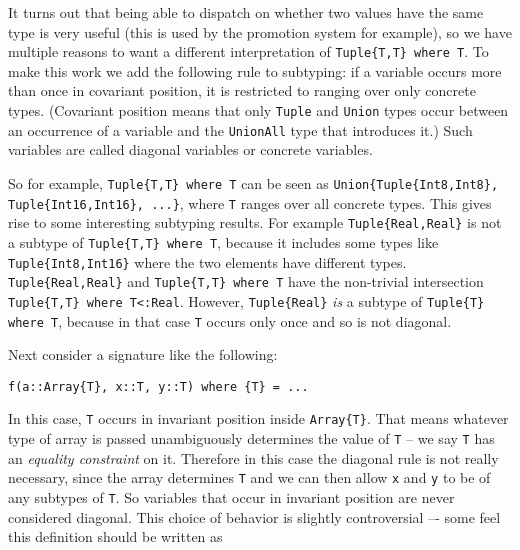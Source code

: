 It turns out that being able to dispatch on whether two values have the same type is very useful (this is used by the promotion system for example), so we have multiple reasons to want a different interpretation of \texttt{Tuple\{T,T\} where T}. To make this work we add the following rule to subtyping: if a variable occurs more than once in covariant position, it is restricted to ranging over only concrete types. ({\textquotedbl}Covariant position{\textquotedbl} means that only \texttt{Tuple} and \texttt{Union} types occur between an occurrence of a variable and the \texttt{UnionAll} type that introduces it.) Such variables are called {\textquotedbl}diagonal variables{\textquotedbl} or {\textquotedbl}concrete variables{\textquotedbl}.



So for example, \texttt{Tuple\{T,T\} where T} can be seen as \texttt{Union\{Tuple\{Int8,Int8\}, Tuple\{Int16,Int16\}, ...\}}, where \texttt{T} ranges over all concrete types. This gives rise to some interesting subtyping results. For example \texttt{Tuple\{Real,Real\}} is not a subtype of \texttt{Tuple\{T,T\} where T}, because it includes some types like \texttt{Tuple\{Int8,Int16\}} where the two elements have different types. \texttt{Tuple\{Real,Real\}} and \texttt{Tuple\{T,T\} where T} have the non-trivial intersection \texttt{Tuple\{T,T\} where T<:Real}. However, \texttt{Tuple\{Real\}} \emph{is} a subtype of \texttt{Tuple\{T\} where T}, because in that case \texttt{T} occurs only once and so is not diagonal.



Next consider a signature like the following:




\begin{verbatim}
f(a::Array{T}, x::T, y::T) where {T} = ...
\end{verbatim}



In this case, \texttt{T} occurs in invariant position inside \texttt{Array\{T\}}. That means whatever type of array is passed unambiguously determines the value of \texttt{T} – we say \texttt{T} has an \emph{equality constraint} on it. Therefore in this case the diagonal rule is not really necessary, since the array determines \texttt{T} and we can then allow \texttt{x} and \texttt{y} to be of any subtypes of \texttt{T}. So variables that occur in invariant position are never considered diagonal. This choice of behavior is slightly controversial –- some feel this definition should be written as




